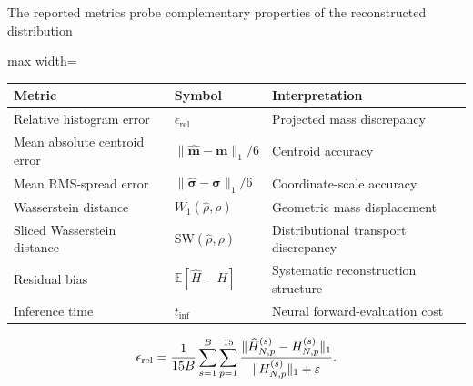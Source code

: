 \begin{frame}[t,shrink=5]{The reported metrics probe complementary properties of the reconstructed distribution}
\begin{center}\begin{adjustbox}{max width=\linewidth}
\begin{tabular}{lll}\toprule
Metric & Symbol & Interpretation\\\midrule
Relative histogram error & $\epsilon_{\mathrm{rel}}$ & Projected mass discrepancy\\
Mean absolute centroid error & $\|\widehat{\mathbf m}-\mathbf m\|_1/6$ & Centroid accuracy\\
Mean RMS-spread error & $\|\widehat{\boldsymbol\sigma}-\boldsymbol\sigma\|_1/6$ & Coordinate-scale accuracy\\
Wasserstein distance & $W_1(\widehat\rho,\rho)$ & Geometric mass displacement\\
Sliced Wasserstein distance & $\mathrm{SW}(\widehat\rho,\rho)$ & Distributional transport discrepancy\\
Residual bias & $\mathbb E[\widehat H-H]$ & Systematic reconstruction structure\\
Inference time & $t_{\mathrm{inf}}$ & Neural forward-evaluation cost\\\bottomrule\end{tabular}
\end{adjustbox}\end{center}\[\epsilon_{\rm rel}=\frac1{15B}\sum_{s=1}^{B}\sum_{p=1}^{15}\frac{\|\widehat H_{N,p}^{(s)}-H_{N,p}^{(s)}\|_1}{\|H_{N,p}^{(s)}\|_1+\varepsilon}.\]

\end{frame}

